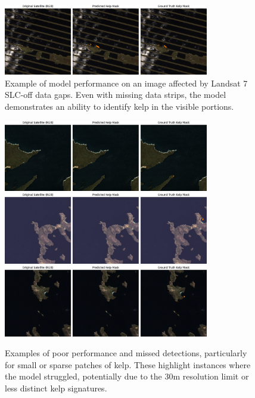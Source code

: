 \documentclass{article}
\begin{document}
\begin{figure}[htbp]
    \centering
    \includegraphics[width=0.8\textwidth]{goodslc.png} %
    \caption{Example of model performance on an image affected by Landsat 7 SLC-off data gaps. Even with missing data strips, the model demonstrates an ability to identify kelp in the visible portions.}
    \label{fig:slc_performance}
\end{figure}

\begin{figure}[htbp]
    \centering
    \includegraphics[width=0.8\textwidth]{bad1.png} %
    \includegraphics[width=0.8\textwidth]{bad2.png}
    \includegraphics[width=0.8\textwidth]{bad3.png}
    \caption{Examples of poor performance and missed detections, particularly for small or sparse patches of kelp. These highlight instances where the model struggled, potentially due to the 30m resolution limit or less distinct kelp signatures.}
    \label{fig:poor_segmentation}
\end{figure}
\end{document}
